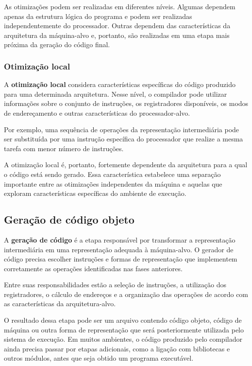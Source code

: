 \documentclass[
  brazilian,
  letterpaper,
]{book}
\theoremstyle{plain}
\theoremstyle{definition}
\theoremstyle{remark}
\begin{document}
As otimizações podem ser realizadas em diferentes níveis. Algumas
dependem apenas da estrutura lógica do programa e podem ser realizadas
independentemente do processador. Outras dependem das características da
arquitetura da máquina-alvo e, portanto, são realizadas em uma etapa
mais próxima da geração do código final.

\subsubsection{Otimização local}\label{otimizauxe7uxe3o-local}

A \textbf{otimização local} considera características específicas do
código produzido para uma determinada arquitetura. Nesse nível, o
compilador pode utilizar informações sobre o conjunto de instruções, os
registradores disponíveis, os modos de endereçamento e outras
características do processador-alvo.

Por exemplo, uma sequência de operações da representação intermediária
pode ser substituída por uma instrução específica do processador que
realize a mesma tarefa com menor número de instruções.

A otimização local é, portanto, fortemente dependente da arquitetura
para a qual o código está sendo gerado. Essa característica estabelece
uma separação importante entre as otimizações independentes da máquina e
aquelas que exploram características específicas do ambiente de
execução.

\subsection{Geração de código
objeto}\label{gerauxe7uxe3o-de-cuxf3digo-objeto}

A \textbf{geração de código} é a etapa responsável por transformar a
representação intermediária em uma representação adequada à
máquina-alvo. O gerador de código precisa escolher instruções e formas
de representação que implementem corretamente as operações identificadas
nas fases anteriores.

Entre suas responsabilidades estão a seleção de instruções, a utilização
dos registradores, o cálculo de endereços e a organização das operações
de acordo com as características da arquitetura-alvo.

O resultado dessa etapa pode ser um arquivo contendo código objeto,
código de máquina ou outra forma de representação que será
posteriormente utilizada pelo sistema de execução. Em muitos ambientes,
o código produzido pelo compilador ainda precisa passar por etapas
adicionais, como a ligação com bibliotecas e outros módulos, antes que
seja obtido um programa executável.
\end{document}
